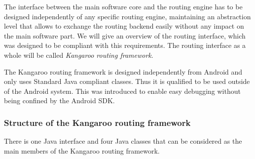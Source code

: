 The interface between the main software core and the routing engine has to be designed independently of any specific routing engine, maintaining an abstraction level that allows to exchange the routing backend easily without any impact on the main software part. We will give an overview of the routing interface, which was designed to be compliant with this requirements. The routing interface as a whole will be called \emph{Kangaroo routing framework}.\newline

The Kangaroo routing framework is designed independently from Android and only uses Standard Java compliant classes. Thus it is qualified to be used outside of the Android system. This was introduced to enable easy debugging without being confined by the Android SDK.

\subsubsection{Structure of the Kangaroo routing framework}

There is one Java interface and four Java classes that can be considered as the main members of the Kangaroo routing framework.

